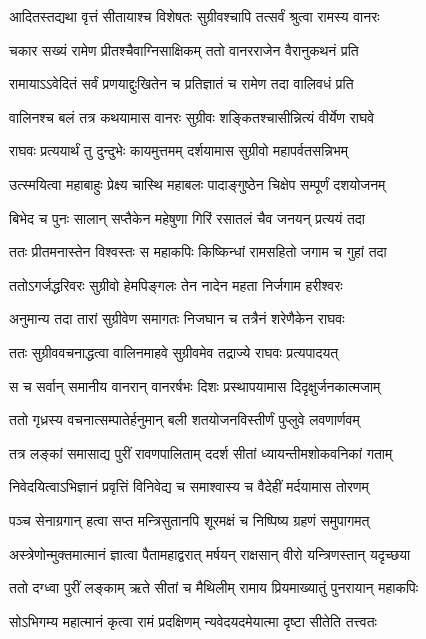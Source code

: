\twolineshloka
{आदितस्तद्यथा वृत्तं सीतायाश्च विशेषतः}
{सुग्रीवश्चापि तत्सर्वं श्रुत्वा रामस्य वानरः}%

\twolineshloka
{चकार सख्यं रामेण प्रीतश्चैवाग्निसाक्षिकम्}
{ततो वानरराजेन वैरानुकथनं प्रति}%

\twolineshloka
{रामायाऽऽवेदितं सर्वं प्रणयाद्दुःखितेन च}
{प्रतिज्ञातं च रामेण तदा वालिवधं प्रति}%

\twolineshloka
{वालिनश्च बलं तत्र कथयामास वानरः}
{सुग्रीवः शङ्कितश्चासीन्नित्यं वीर्येण राघवे}%

\twolineshloka
{राघवः प्रत्ययार्थं तु दुन्दुभेः कायमुत्तमम्}
{दर्शयामास सुग्रीवो महापर्वतसन्निभम्}%

\twolineshloka
{उत्स्मयित्वा महाबाहुः प्रेक्ष्य चास्थि महाबलः}
{पादाङ्गुष्ठेन चिक्षेप सम्पूर्णं दशयोजनम्}%

\twolineshloka
{बिभेद च पुनः सालान् सप्तैकेन महेषुणा}
{गिरिं रसातलं चैव जनयन् प्रत्ययं तदा}%

\twolineshloka
{ततः प्रीतमनास्तेन विश्वस्तः स महाकपिः}
{किष्किन्धां रामसहितो जगाम च गुहां तदा}%

\twolineshloka
{ततोऽगर्जद्धरिवरः सुग्रीवो हेमपिङ्गलः}
{तेन नादेन महता निर्जगाम हरीश्वरः}%

\twolineshloka
{अनुमान्य तदा तारां सुग्रीवेण समागतः}
{निजघान च तत्रैनं शरेणैकेन राघवः}%

\twolineshloka
{ततः सुग्रीववचनाद्धत्वा वालिनमाहवे}
{सुग्रीवमेव तद्राज्ये राघवः प्रत्यपादयत्}%

\twolineshloka
{स च सर्वान् समानीय वानरान् वानरर्षभः}
{दिशः प्रस्थापयामास दिदृक्षुर्जनकात्मजाम्}%

\twolineshloka
{ततो गृध्रस्य वचनात्सम्पातेर्हनुमान् बली}
{शतयोजनविस्तीर्णं पुप्लुवे लवणार्णवम्}%

\twolineshloka
{तत्र लङ्कां समासाद्य पुरीं रावणपालिताम्}
{ददर्श सीतां ध्यायन्तीमशोकवनिकां गताम्}%

\twolineshloka
{निवेदयित्वाऽभिज्ञानं प्रवृत्तिं विनिवेद्य च}
{समाश्वास्य च वैदेहीं मर्दयामास तोरणम्}%

\twolineshloka
{पञ्च सेनाग्रगान् हत्वा सप्त मन्त्रिसुतानपि}
{शूरमक्षं च निष्पिष्य ग्रहणं समुपागमत्}%

\twolineshloka
{अस्त्रेणोन्मुक्तमात्मानं ज्ञात्वा पैतामहाद्वरात्}
{मर्षयन् राक्षसान् वीरो यन्त्रिणस्तान् यदृच्छया}%

\twolineshloka
{ततो दग्ध्वा पुरीं लङ्काम् ऋते सीतां च मैथिलीम्}
{रामाय प्रियमाख्यातुं पुनरायान् महाकपिः}%

\twolineshloka
{सोऽभिगम्य महात्मानं कृत्वा रामं प्रदक्षिणम्}
{न्यवेदयदमेयात्मा दृष्टा सीतेति तत्त्वतः}%

